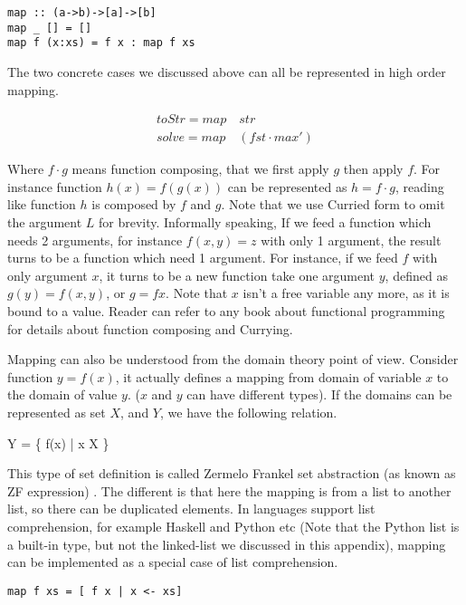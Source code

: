 \documentclass[b5paper]{article}
\begin{document}
\lstset{language=Haskell}
\begin{lstlisting}
map :: (a->b)->[a]->[b]
map _ [] = []
map f (x:xs) = f x : map f xs
\end{lstlisting}

The two concrete cases we discussed above can all be represented in high order mapping.

\[
\begin{array}{l}
toStr  = map \quad str \\
solve = map \quad (fst \cdot max')
\end{array}
\]

Where $f \cdot g$ means function composing, that we first apply $g$ then apply $f$. For instance
function $h(x) = f(g(x))$ can be represented as $h = f \cdot g $, reading like function $h$ is
composed by $f$ and $g$. Note that we use Curried form to omit the argument $L$ for brevity.
Informally speaking, If we feed a function which needs 2 arguments, for instance $f(x, y) = z$
with only 1 argument, the result turns to be a function which need 1 argument. For instance,
if we feed $f$ with only argument $x$, it turns to be a new function take one argument $y$,
defined as $g(y) = f(x, y)$, or $g = f x$. Note that $x$ isn't a free variable any more,
as it is bound to a value. Reader can refer to any book about functional programming
for details about function composing and Currying.

Mapping can also be understood from the domain theory point of view. Consider function $y = f(x)$,
it actually defines a mapping from domain of variable $x$ to the domain of value $y$. ($x$
and $y$ can have different types). If the domains can be represented as set $X$, and $Y$, we have
the following relation.

\be
Y = \{ f(x) | x \in X \}
\ee

This type of set definition is called Zermelo Frankel set abstraction (as known as ZF expression) \cite{algo-fp}. The different
is that here the mapping is from a list to another list, so there can be duplicated elements.
In languages support list comprehension, for example Haskell and Python etc (Note that the
Python list is a built-in type, but not the linked-list we discussed in this appendix), mapping
can be implemented as a special case of list comprehension.

\lstset{language=Haskell}
\begin{lstlisting}
map f xs = [ f x | x <- xs]
\end{lstlisting}
\end{document}
